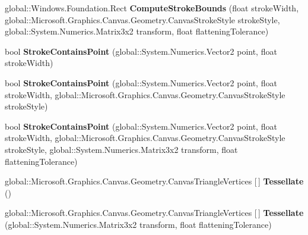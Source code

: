 \begin{DoxyCompactItemize}
global\+::\+Windows.\+Foundation.\+Rect {\bfseries Compute\+Stroke\+Bounds} (float stroke\+Width, global\+::\+Microsoft.\+Graphics.\+Canvas.\+Geometry.\+Canvas\+Stroke\+Style stroke\+Style, global\+::\+System.\+Numerics.\+Matrix3x2 transform, float flattening\+Tolerance)
\item 
\mbox{\label{class_microsoft_1_1_graphics_1_1_canvas_1_1_geometry_1_1_canvas_geometry_a487c9868385c05d9028ba59b0663e9f3}} 
bool {\bfseries Stroke\+Contains\+Point} (global\+::\+System.\+Numerics.\+Vector2 point, float stroke\+Width)
\item 
\mbox{\label{class_microsoft_1_1_graphics_1_1_canvas_1_1_geometry_1_1_canvas_geometry_add386d8e31ab0caf7b1b42d94e038fcd}} 
bool {\bfseries Stroke\+Contains\+Point} (global\+::\+System.\+Numerics.\+Vector2 point, float stroke\+Width, global\+::\+Microsoft.\+Graphics.\+Canvas.\+Geometry.\+Canvas\+Stroke\+Style stroke\+Style)
\item 
\mbox{\label{class_microsoft_1_1_graphics_1_1_canvas_1_1_geometry_1_1_canvas_geometry_a41adeb9ece02222f6a21e9635da34d5b}} 
bool {\bfseries Stroke\+Contains\+Point} (global\+::\+System.\+Numerics.\+Vector2 point, float stroke\+Width, global\+::\+Microsoft.\+Graphics.\+Canvas.\+Geometry.\+Canvas\+Stroke\+Style stroke\+Style, global\+::\+System.\+Numerics.\+Matrix3x2 transform, float flattening\+Tolerance)
\item 
\mbox{\label{class_microsoft_1_1_graphics_1_1_canvas_1_1_geometry_1_1_canvas_geometry_a0a66062ad10deeea0d4c354fa37dd1e5}} 
global\+::\+Microsoft.\+Graphics.\+Canvas.\+Geometry.\+Canvas\+Triangle\+Vertices \mbox{[}$\,$\mbox{]} {\bfseries Tessellate} ()
\item 
\mbox{\label{class_microsoft_1_1_graphics_1_1_canvas_1_1_geometry_1_1_canvas_geometry_ad81e27003f60c585c31cd07e1bd2a92a}} 
global\+::\+Microsoft.\+Graphics.\+Canvas.\+Geometry.\+Canvas\+Triangle\+Vertices \mbox{[}$\,$\mbox{]} {\bfseries Tessellate} (global\+::\+System.\+Numerics.\+Matrix3x2 transform, float flattening\+Tolerance)

\end{DoxyCompactItemize}
